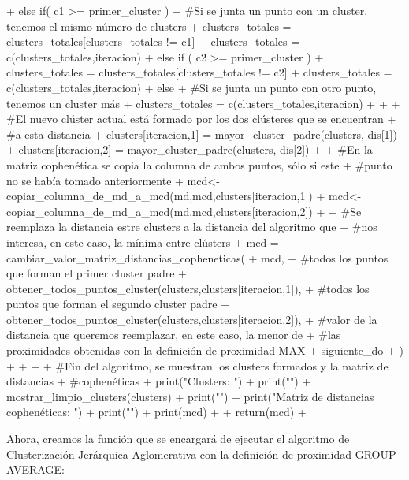 \documentclass[parskip=full]{scrartcl}
\begin{document}
\begin{Schunk}
\begin{Sinput}
{{{{+       } else if( c1 >= primer_cluster ) {
+         #Si se junta un punto con un cluster, tenemos el mismo número de clusters
+         clusters_totales = clusters_totales[clusters_totales != c1]
+         clusters_totales = c(clusters_totales,iteracion)
+       } else if ( c2 >= primer_cluster ) {
+         clusters_totales = clusters_totales[clusters_totales != c2]
+         clusters_totales = c(clusters_totales,iteracion)
+       } else { 
+         #Si se junta un punto con otro punto, tenemos un cluster más
+         clusters_totales = c(clusters_totales,iteracion)
+       }
+       
+       #El nuevo clúster actual está formado por los dos clústeres que se encuentran
+       #a esta distancia
+       clusters[iteracion,1] = mayor_cluster_padre(clusters, dis[1])
+       clusters[iteracion,2] = mayor_cluster_padre(clusters, dis[2])
+       
+       #En la matriz cophenética se copia la columna de ambos puntos, sólo si este
+       #punto no se había tomado anteriormente
+       mcd<-copiar_columna_de_md_a_mcd(md,mcd,clusters[iteracion,1])
+       mcd<-copiar_columna_de_md_a_mcd(md,mcd,clusters[iteracion,2])
+       
+       #Se reemplaza la distancia estre clusters a la distancia del algoritmo que
+       #nos interesa, en este caso, la mínima entre clústers
+       mcd = cambiar_valor_matriz_distancias_copheneticas(
+         mcd,
+         #todos los puntos que forman el primer cluster padre
+         obtener_todos_puntos_cluster(clusters,clusters[iteracion,1]),
+         #todos los puntos que forman el segundo cluster padre
+         obtener_todos_puntos_cluster(clusters,clusters[iteracion,2]),
+         #valor de la distancia que queremos reemplazar, en este caso, la menor de
+         #las proximidades obtenidas con la definición de proximidad MAX
+         siguiente_do 
+       )
+     }
+   }
+   
+   #Fin del algoritmo, se muestran los clusters formados y la matriz de distancias
+   #cophenéticas
+   print("Clusters: ")
+   print("")
+   mostrar_limpio_clusters(clusters)
+   print("")
+   print("Matriz de distancias cophenéticas: ")
+   print("")
+   print(mcd)
+   
+   return(mcd)
+ }
\end{Sinput}
\end{Schunk}


Ahora, creamos la función que se encargará de ejecutar el algoritmo de Clusterización Jerárquica Aglomerativa con la definición de proximidad GROUP AVERAGE:
\end{document}
